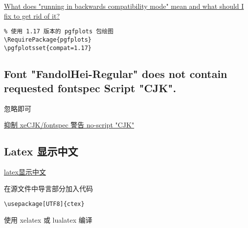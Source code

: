 \documentclass{UJSBachelor} %
\begin{document}
\href{https://tex.stackexchange.com/questions/81899/what-does-running-in-backwards-compatibility-mode-mean-and-what-should-i-fix-t}{What does "running in backwards compatibility mode" mean and what should I fix to get rid of it?}

\lstset{
    basicstyle=\ttfamily,   
    breaklines=true
}
\begin{lstlisting}
% 使用 1.17 版本的 pgfplots 包绘图
\RequirePackage{pgfplots}
\pgfplotsset{compat=1.17}
\end{lstlisting}


\subsection{Font "FandolHei-Regular" does not contain requested fontspec Script "CJK".}

忽略即可

\href{https://zhuanlan.zhihu.com/p/145429470}{抑制 xeCJK/fontspec 警告 no-script "CJK"}


\subsection{Latex 显示中文}

\href{https://blog.csdn.net/hungryfoolisher/article/details/110099026}{latex显示中文}

在源文件中导言部分加入代码 

\lstset{
    basicstyle=\ttfamily,   
    breaklines=true
}
\begin{lstlisting}
\usepackage[UTF8]{ctex}
\end{lstlisting}


使用 xelatex 或 lualatex 编译
\end{document}
